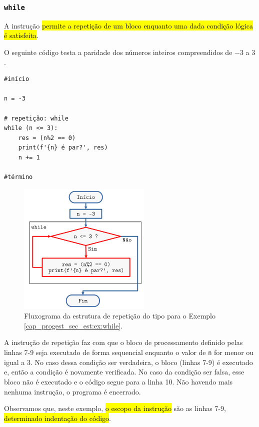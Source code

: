 \subsubsection{\texttt{while}}

A instrução \hl{{\PYTHONwhile} permite a repetição de um bloco enquanto uma dada condição lógica é satisfeita}.

\begin{ex}\label{cap_progest_sec_est:ex:while}
  O seguinte código testa a paridade dos números inteiros compreendidos de $-3$ a $3$.

\begin{lstlisting}
#início

n = -3

# repetição: while
while (n <= 3):
    res = (n%2 == 0)
    print(f'{n} é par?', res)
    n += 1
    
#término
\end{lstlisting}

\begin{figure}[ht]
  \centering
  \includegraphics[width=2.5in]{./cap_progest/dados/fig_fg_while_ex/fig.png}
  \caption{Fluxograma da estrutura de repetição do tipo {\PYTHONwhile} para o Exemplo \ref{cap_progest_sec_est:ex:while}.}
  \label{cap_progest_sec_est:fig:fg_while_ex}
\end{figure}


A instrução de repetição {\PYTHONwhile} faz com que o bloco de processamento definido pelas linhas 7-9 seja executado de forma sequencial enquanto o valor de \lstinline+n+ for menor ou igual a 3. No caso dessa condição ser verdadeira, o bloco (linhas 7-9) é executado e, então a condição é novamente verificada. No caso da condição ser falsa, esse bloco não é executado e o código segue para a linha 10. Não havendo mais nenhuma instrução, o programa é encerrado.

Observamos que, neste exemplo, \hl{o escopo da instrução {\PYTHONwhile}} são as linhas 7-9, \hl{determinado indentação do código}.
\end{ex}

